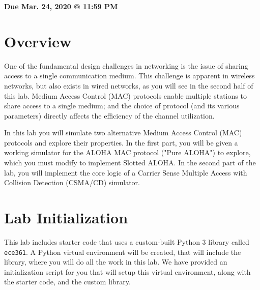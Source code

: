 \documentclass[11pt]{article}
\makeatletter
\def\datedue{Mar. 24, 2020 @ 11:59 PM}
\makeatother
\begin{document}
\maketitle \thispagestyle{fancy}

\hfill {\large \textbf{Due \datedue}}


\section{Overview}
\label{sec:overview}
One of the fundamental design challenges in networking is the issue of sharing access to a single communication medium.
This challenge is apparent in wireless networks, but also exists in wired networks, as you will see in the second half of this lab.
Medium Access Control (MAC) protocols enable multiple stations to share access to a single medium; and the choice of protocol (and its various parameters) directly affects the efficiency of the channel utilization.

In this lab you will simulate two alternative Medium Access Control (MAC) protocols and explore their properties.
In the first part, you will be given a working simulator for the ALOHA MAC protocol ("Pure ALOHA") to explore, which you must modify to implement Slotted ALOHA.
In the second part of the lab, you will implement the core logic of a Carrier Sense Multiple Access with Collision Detection (CSMA/CD) simulator.

\section{Lab Initialization}
\label{subsec:lab-init}
This lab includes starter code that uses a custom-built Python 3 library called \texttt{ece361}.
A Python virtual environment will be created, that will include the library, where you will do all the work in this lab.
We have provided an initialization script for you that will setup this virtual environment, along with the starter code, and the custom library.
\end{document}
